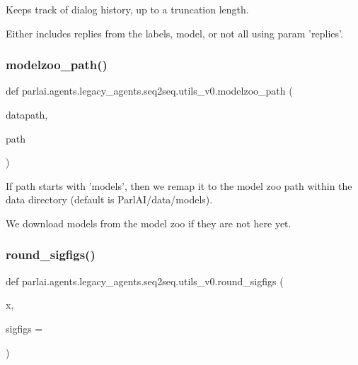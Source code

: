 \begin{DoxyVerb}Keeps track of dialog history, up to a truncation length.

Either includes replies from the labels, model, or not all using param 'replies'.
\end{DoxyVerb}
 \mbox{\label{namespaceparlai_1_1agents_1_1legacy__agents_1_1seq2seq_1_1utils__v0_a5fbd3301b67f00d6d146fb01c7cd7626}} 
\subsubsection{\texorpdfstring{modelzoo\+\_\+path()}{modelzoo\_path()}}
{\footnotesize\ttfamily def parlai.\+agents.\+legacy\+\_\+agents.\+seq2seq.\+utils\+\_\+v0.\+modelzoo\+\_\+path (\begin{DoxyParamCaption}\item[{}]{datapath,  }\item[{}]{path }\end{DoxyParamCaption})}

\begin{DoxyVerb}If path starts with 'models', then we remap it to the model zoo path within the data
directory (default is ParlAI/data/models).

We download models from the model zoo if they are not here yet.
\end{DoxyVerb}
 \mbox{\label{namespaceparlai_1_1agents_1_1legacy__agents_1_1seq2seq_1_1utils__v0_af377ec61bfc0423461e7b409ffc883b9}} 
\subsubsection{\texorpdfstring{round\+\_\+sigfigs()}{round\_sigfigs()}}
{\footnotesize\ttfamily def parlai.\+agents.\+legacy\+\_\+agents.\+seq2seq.\+utils\+\_\+v0.\+round\+\_\+sigfigs (\begin{DoxyParamCaption}\item[{}]{x,  }\item[{}]{sigfigs = {} }\end{DoxyParamCaption})}


